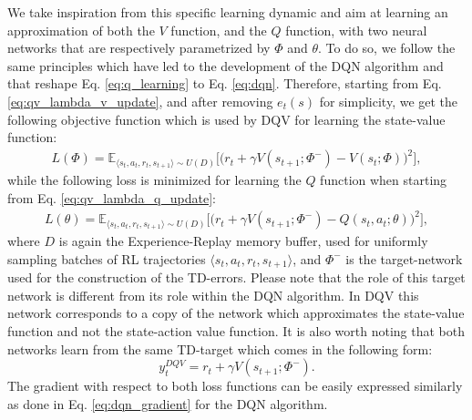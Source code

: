We take inspiration from this specific learning dynamic and aim at learning an approximation of both the $V$ function, and the $Q$ function, with two neural networks that are respectively parametrized by $\Phi$ and $\theta$. To do so, we follow the same principles which have led to the development of the DQN algorithm and that reshape Eq. \ref{eq:q_learning} to Eq. \ref{eq:dqn}. Therefore, starting from Eq.\ref{eq:qv_lambda_v_update}, and after removing $e_{t}(s)$ for simplicity, we get the following objective function which is used by DQV for learning the state-value function:
\begin{multline}
L(\Phi) = \mathds{E}_{\langle s_{t},a_{t},r_{t},s_{t+1}\rangle\sim U(D)} \bigg[\big(r_{t} + \gamma V(s_{t+1}; \Phi^{-}) - V(s_{t}; \Phi)\big)^{2}\bigg],
\label{eq:dqv_v_update}
\end{multline}
while the following loss is minimized for learning the $Q$ function when starting from Eq. \ref{eq:qv_lambda_q_update}:
\begin{multline}
    L(\theta) = \mathds{E}_{\langle s_{t},a_{t},r_{t},s_{t+1}\rangle\sim U(D)} \bigg[\big(r_{t} + \gamma V(s_{t+1}; \Phi^{-}) - Q(s_{t}, a_{t}; \theta)\big)^{2}\bigg],
\label{eq:dqv_q_update}
\end{multline}
where $D$ is again the Experience-Replay memory buffer, used for uniformly sampling batches of RL trajectories $\langle s_{t},a_{t},r_{t},s_{t+1}\rangle$, and $\Phi^{-}$ is the target-network used for the construction of the TD-errors. Please note that the role of this target network is different from its role within the DQN algorithm. In DQV this network corresponds to a copy of the network which approximates the state-value function and not the state-action value function. It is also worth noting that both networks learn from the same TD-target which comes in the following form:
\begin{equation}
y_{t}^{DQV} = r_{t} + \gamma V(s_{t+1}; \Phi^{-}). 
\end{equation}
The gradient with respect to both loss functions can be easily expressed similarly as done in Eq. \ref{eq:dqn_gradient} for the DQN algorithm.

